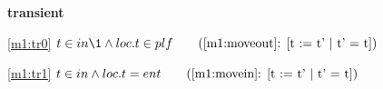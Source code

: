 \textbf{transient}
\begin{block}
\item[ \eqref{m1:tr0} ]$t \in in  %
		\1\land loc.t \in plf  \qquad \text{(\ref{m1:moveout}: [t := t' | t' = t])}$ %
\item[ \eqref{m1:tr1} ]$t \in in \land loc.t = ent  \qquad \text{(\ref{m1:movein}: [t := t' | t' = t])}$ %
\end{block}
